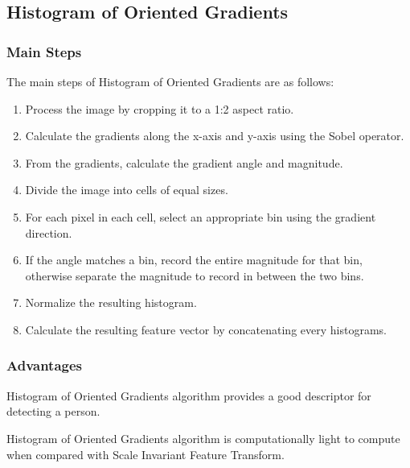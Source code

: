 \documentclass[conference]{IEEEtran}
\begin{document}
\subsection{Histogram of Oriented Gradients}
\subsubsection{Main Steps}
The main steps of Histogram of Oriented Gradients are as follows:
\begin{enumerate}
    \item Process the image by cropping it to a 1:2 aspect ratio\cite{hog-1}.
    \item Calculate the gradients along the x-axis and y-axis using the Sobel
          operator.
    \item From the gradients, calculate the gradient angle and
          magnitude\cite{hog-3}.
    \item Divide the image into cells of equal sizes.
    \item For each pixel in each cell, select an appropriate bin using the
          gradient direction.
    \item If the angle matches a bin, record the entire magnitude for that bin,
          otherwise separate the magnitude to record in between the two bins.
    \item Normalize the resulting histogram.
    \item Calculate the resulting feature vector by concatenating every
          histograms.
\end{enumerate}


%
%


\subsubsection{Advantages}
Histogram of Oriented Gradients algorithm provides a good descriptor for
detecting a person\cite{hog-1}.

Histogram of Oriented Gradients algorithm is computationally light to compute
when compared with Scale Invariant Feature Transform.
\end{document}

